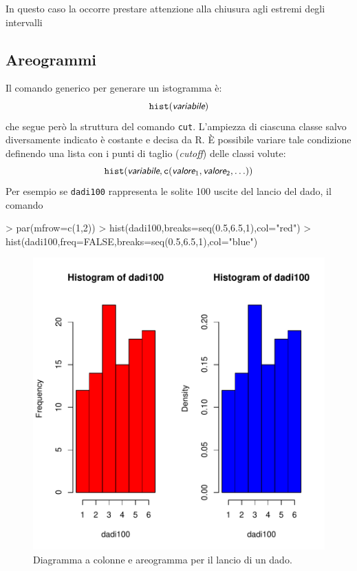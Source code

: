 \documentclass[onecolumn,12pt]{book}
\newcommand{\varia}[1]{\textsl{\textsf{#1}}}
\begin{document}
In questo caso la occorre prestare attenzione alla chiusura agli estremi degli intervalli\subsection{Areogrammi}
Il comando generico per generare un istogramma \`e:
\begin{equation*}
\texttt{hist}(\varia{variabile})
\end{equation*}
che segue per\`o la struttura del comando \texttt{cut}. L'ampiezza di ciascuna classe salvo diversamente indicato \`e costante e decisa da \textsf{R}.
\`E  possibile variare tale condizione definendo una lista con i punti di taglio ({\it cutoff}) delle classi volute:
\begin{equation} \texttt{hist}(\varia{variabile},\texttt{c}(\varia{valore}_1, \varia{valore}_2, \ldots))
\end{equation}
Per esempio se \texttt{dadi100} rappresenta le solite 100 uscite del lancio del dado, il comando
\begin{Schunk}
\begin{Sinput}
> par(mfrow=c(1,2))
> hist(dadi100,breaks=seq(0.5,6.5,1),col="red")
> hist(dadi100,freq=FALSE,breaks=seq(0.5,6.5,1),col="blue")
\end{Sinput}
\end{Schunk}
\begin{figure}[htbp]
\begin{center}
\includegraphics{RbookParte2-037}
\caption{ Diagramma a colonne e areogramma per il lancio di un dado.}
\label{fig:datiiist}
\end{center}
\end{figure}
\end{document}
